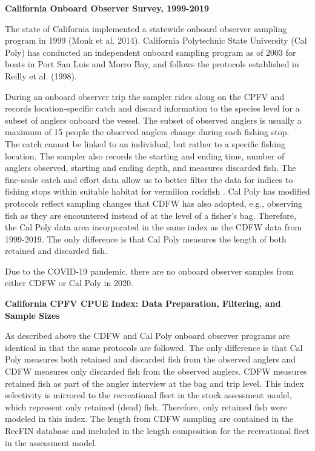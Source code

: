 \documentclass[11pt,
  english,
]{article}
\begin{document}
\leavevmode\tagmcend\tagstructend

\renewcommand{\thepage}{C\arabic{page}}
\renewcommand{\thefigure}{C\arabic{figure}}
\renewcommand{\thetable}{C\arabic{table}}
\setcounter{page}{1}
\setcounter{figure}{0}
\setcounter{table}{0}

\textbf{California Onboard Observer Survey, 1999-2019}

The state of California implemented a statewide onboard observer sampling program in 1999 {(Monk et al. 2014)\leavevmode\tagmcend\tagstructend}. California Polytechnic State University (Cal Poly) has conducted an independent onboard sampling program as of 2003 for boats in Port San Luis and Morro Bay, and follows the protocols established in Reilly et al. {(1998)\leavevmode\tagmcend\tagstructend}.

During an onboard observer trip the sampler rides along on the CPFV and records location-specific catch and discard information to the species level for a subset of anglers onboard the vessel. The subset of observed anglers is usually a maximum of 15 people the observed anglers change during each fishing stop.\\
The catch cannot be linked to an individual, but rather to a specific fishing location. The sampler also records the starting and ending time, number of anglers observed, starting and ending depth, and measures discarded fish. The fine-scale catch and effort data allow us to better filter the data for indices to fishing stops within suitable habitat for vermilion rockfish . Cal Poly has modified protocols reflect sampling changes that CDFW has also adopted, e.g., observing fish as they are encountered instead of at the level of a fisher's bag. Therefore, the Cal Poly data area incorporated in the same index as the CDFW data from 1999-2019. The only difference is that Cal Poly measures the length of both retained and discarded fish.

Due to the COVID-19 pandemic, there are no onboard observer samples from either CDFW or Cal Poly in 2020.

\textbf{California CPFV CPUE Index: Data Preparation, Filtering, and Sample Sizes}

As described above the CDFW and Cal Poly onboard observer programs are identical in that the same protocols are followed. The only difference is that Cal Poly measures both retained and discarded fish from the observed anglers and CDFW measures only discarded fish from the observed anglers. CDFW measures retained fish as part of the angler interview at the bag and trip level. This index selectivity is mirrored to the recreational fleet in the stock assessment model, which represent only retained (dead) fish. Therefore, only retained fish were modeled in this index. The length from CDFW sampling are contained in the RecFIN database and included in the length composition for the recreational fleet in the assessment model.
\end{document}
